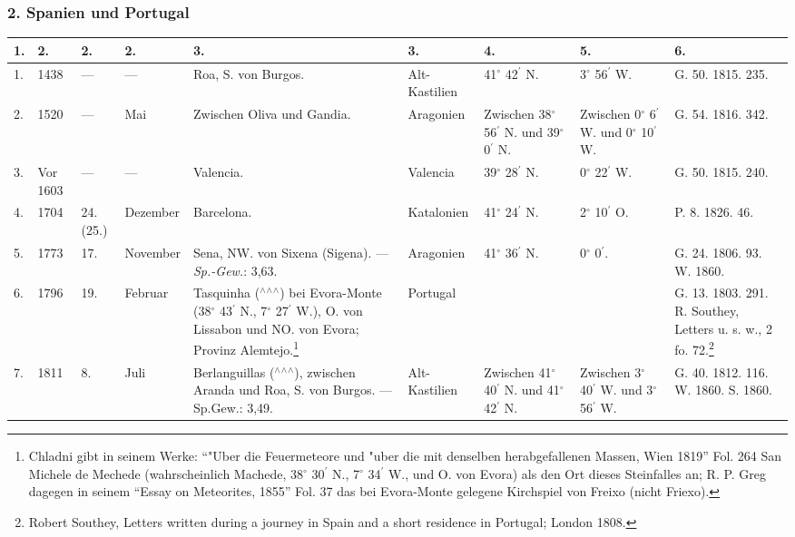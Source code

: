 \documentclass[a4paper, 8pt, oneside, polutonikogreek, german]{article}
\begin{document}
\subsubsection{2. Spanien und Portugal}
\begin{center}
    \footnotesize
    \begin{longtable}{|p{3mm}|p{7mm}|p{5mm}|p{16mm}|p{25mm}|p{17mm}|p{13mm}|p{13mm}|p{13mm}|}
    \hline
        1. & 2. & 2. & 2. & 3. & 3. & 4. & 5. & 6. \\ \hline
        1. & 1438 & --- & --- & Roa, S. von Burgos. & Alt-Kastilien & 41$^\circ$ 42$^\prime$ N. & 3$^\circ$ 56$^\prime$ W. & G. 50. 1815. 235. \\ \hline
        2. & 1520 & --- & Mai & Zwischen Oliva und Gandia. & Aragonien & Zwischen 38$^\circ$ 56$^\prime$ N. und 39$^\circ$ 0$^\prime$ N. & Zwischen 0$^\circ$ 6$^\prime$ W. und 0$^\circ$ 10$^\prime$ W. & G. 54. 1816. 342. \\ \hline
        3. & Vor 1603 & --- & --- & Valencia. & Valencia & 39$^\circ$ 28$^\prime$ N. & 0$^\circ$ 22$^\prime$ W. & G. 50. 1815. 240. \\ \hline
        4. & 1704 & 24. (25.) & Dezember & Barcelona. & Katalonien & 41$^\circ$ 24$^\prime$ N. & 2$^\circ$ 10$^\prime$ O. & P. 8. 1826. 46. \\ \hline
        5. & 1773 & 17. & November & Sena, NW. von Sixena (Sigena). --- \emph{Sp.-Gew.}: 3,63. & Aragonien & 41$^\circ$ 36$^\prime$ N. & 0$^\circ$ 0$^\prime$. & G. 24. 1806. 93. W. 1860. \\ \hline
        6. & 1796 & 19. & Februar & Tasquinha ($^\wedge$$^\wedge$$^\wedge$) bei Evora-Monte (38$^\circ$ 43$^\prime$ N., 7$^\circ$ 27$^\prime$ W.), O. von Lissabon und NO. von Evora; Provinz Alemtejo.\footnote{Chladni gibt in seinem Werke: "`"Uber die Feuermeteore und "uber die mit denselben herabgefallenen Massen, Wien 1819"' Fol. 264 San Michele de Mechede (wahrscheinlich Machede, 38$^\circ$ 30$^\prime$ N., 7$^\circ$ 34$^\prime$ W., und O. von Evora) als den Ort dieses Steinfalles an; R. P. Greg dagegen in seinem "`Essay on Meteorites, 1855"' Fol. 37 das bei Evora-Monte gelegene Kirchspiel von Freixo (nicht Friexo).} & Portugal & ~ & ~ & G. 13. 1803. 291. R. Southey, Letters u. s. w., 2 fo. 72.\footnote{Robert Southey, Letters written during a journey in Spain and a short residence in Portugal; London 1808.} \\ \hline
        7. & 1811 & 8. & Juli & Berlanguillas ($^\wedge$$^\wedge$$^\wedge$), zwischen Aranda und Roa, S. von Burgos. --- Sp.Gew.: 3,49. & Alt-Kastilien & Zwischen 41$^\circ$ 40$^\prime$ N. und 41$^\circ$ 42$^\prime$ N. & Zwischen 3$^\circ$ 40$^\prime$ W. und 3$^\circ$ 56$^\prime$ W. & G. 40. 1812. 116. W. 1860. S. 1860. \\ \hline

\end{longtable}
\end{center}
\end{document}
